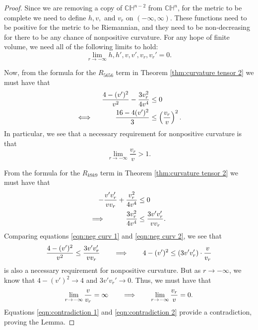 \documentclass[10pt,a4paper]{amsart}
\def\C{\mathbb{C}}
\def\H{\mathbb{H}}
\begin{document}
\begin{proof}
Since we are removing a copy of $\C \H^{n-2}$ from $\C \H^n$, for the metric to be complete we need to define $h, v, $ and $v_r$ on $(- \infty, \infty)$.  
These functions need to be positive for the metric to be Riemannian, and they need to be non-decreasing for there to be any chance of nonpositive curvature.  
For any hope of finite volume, we need all of the following limits to hold:
	\begin{equation*}
	\lim_{r \to - \infty} h, h', v, v', v_r, v_r' = 0.
	\end{equation*}
	
Now, from the formula for the $R_{5656}$ term in Theorem \ref{thm:curvature tensor 2} we must have that
	\begin{align}
	\frac{4-(v')^2}{v^2} - \frac{3v_r^2}{4v^4} &\leq 0  \label{eqn:neg curv 1}  \\
	\iff	\hskip 30pt	\frac{16 - 4(v')^2}{3} &\leq \left( \frac{v_r}{v} \right)^2.  \nonumber
	\end{align}
In particular, we see that a necessary requirement for nonpositive curvature is that
	\begin{equation}\label{eqn:contradiction 1}
	\lim_{r \to - \infty} \frac{v_r}{v} > 1.
	\end{equation}
	
From the formula for the $R_{k9k9}$ term in Theorem \ref{thm:curvature tensor 2} we must have that
	\begin{align}
	- \frac{v' v_r'}{v v_r} + \frac{v_r^2}{4v^4} &\leq 0  \nonumber  \\
	\Longrightarrow	\hskip 30pt	\frac{3v_r^2}{4v^4} &\leq \frac{3 v' v_r'}{v v_r}.  \label{eqn:neg curv 2}
	\end{align}
Comparing equations \eqref{eqn:neg curv 1} and \eqref{eqn:neg curv 2}, we see that
	\begin{equation*}
	\frac{4 - (v')^2}{v^2} \leq \frac{3 v' v_r'}{v v_r}	\hskip 20pt	\Longrightarrow		\hskip 20pt	4 - (v')^2 \leq (3v'v_r') \cdot \frac{v}{v_r}
	\end{equation*}
is also a necessary requirement for nonpositive curvature.  
But as $r \to - \infty$, we know that $4 - (v')^2 \to 4$ and $3 v' v_r' \to 0$.  
Thus, we must have that
	\begin{equation}\label{eqn:contradiction 2}
	\lim_{r \to - \infty} \frac{v}{v_r} = \infty	\hskip 20pt	\Longrightarrow		\hskip 20pt	\lim_{r \to - \infty} \frac{v_r}{v} = 0.
	\end{equation}
Equations \eqref{eqn:contradiction 1} and \eqref{eqn:contradiction 2} provide a contradiction, proving the Lemma.
	
\end{proof}
\end{document}
